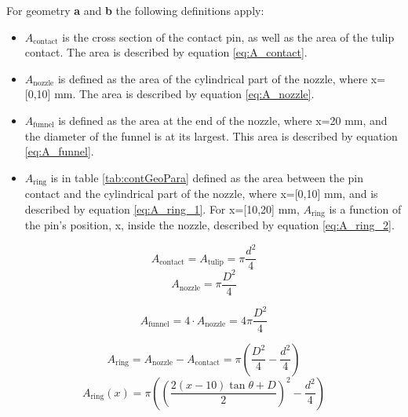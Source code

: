 \documentclass[10pt,b5paper,twoside]{article}
\begin{document}
\newpage
For geometry \textbf{a} and \textbf{b} the following definitions apply:
\begin{itemize}
\item $A_\mathrm{{contact}}$ is the cross section of the contact pin, as well as the area of the tulip contact. The area is described by equation \eqref{eq:A_contact}.

\item $A_\mathrm{{nozzle}}$ is defined as the area of the cylindrical part of the nozzle, where x=[0,10] mm. The area is described by equation \eqref{eq:A_nozzle}.

\item $A_\mathrm{{funnel}}$ is defined as the area at the end of the nozzle, where x=20 mm, and the diameter of the funnel is at its largest. This area is described by equation \eqref{eq:A_funnel}.

\item $A_\mathrm{{ring}}$ is in table \ref{tab:contGeoPara} defined as the area between the pin contact and the cylindrical part of the nozzle, where x=[0,10] mm, and is described by equation \eqref{eq:A_ring_1}. For x=[10,20] mm, $A_\mathrm{{ring}}$ is a function of the pin's position, x, inside the nozzle, described by equation \eqref{eq:A_ring_2}.
\end{itemize}

\begin{equation} \label{eq:A_contact}
A_\mathrm{{contact}}=A_\mathrm{{tulip}}=\pi \frac{d^2}{4}
\end{equation}
\begin{equation} \label{eq:A_nozzle}
A_\mathrm{{nozzle}}=\pi \frac{D^2}{4}
\end{equation}

\begin{equation} \label{eq:A_funnel}
A_\mathrm{{funnel}}=4 \cdot A_\mathrm{{nozzle}}=4\pi \frac{D^2}{4}
\end{equation}

\begin{equation} \label{eq:A_ring_1}
A_\mathrm{{ring}}=A_\mathrm{{nozzle}}-A_\mathrm{{contact}}=\pi\left( \frac{D^2}{4}-\frac{d^2}{4}\right)
\end{equation}
\begin{equation} \label{eq:A_ring_2}
A_\mathrm{{ring}}(x)=\pi\left( \left(\frac{2(x-10)\tan \theta + D}{2}\right)^2-\frac{d^2}{4}\right)
\end{equation}
\end{document}
